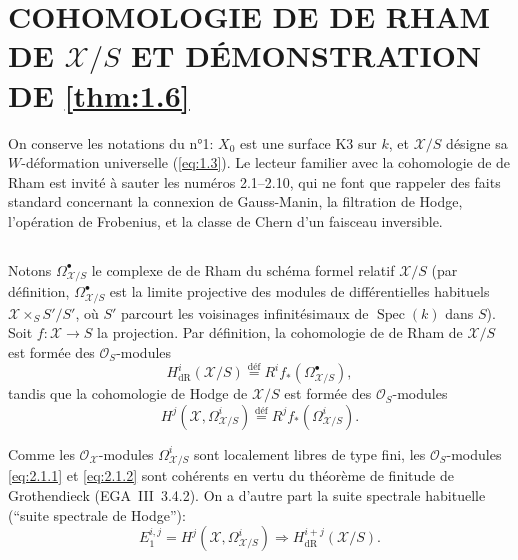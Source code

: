 \documentclass[12pt,a4paper]{article}
\theoremstyle{plain}
\theoremstyle{definition}
\theoremstyle{remark}
\DeclareMathOperator{\Spec}{Spec}
\begin{document}
\section{COHOMOLOGIE DE DE RHAM DE $\mathcal{X}/S$ ET DÉMONSTRATION DE \ref{thm:1.6}}\label{sec:2}

On conserve les notations du n°1: $X_0$ est une surface K3 sur $k$, et $\mathcal{X}/S$ désigne sa $W$-déformation universelle (\eqref{eq:1.3}). Le lecteur familier avec la cohomologie de de Rham est invité à sauter les numéros 2.1--2.10, qui ne font que rappeler des faits standard concernant la connexion de Gauss-Manin, la filtration de Hodge, l'opération de Frobenius, et la classe de Chern d'un faisceau inversible.

\subsection{}

Notons $\Omega_{\mathcal{X}/S}^{\bullet}$ le complexe de de Rham du schéma formel relatif $\mathcal{X}/S$ (par définition, $\Omega_{\mathcal{X}/S}^{\bullet}$ est la limite projective des modules de différentielles habituels $\mathcal{X} \times_S S'/S'$, où $S'$ parcourt les voisinages infinitésimaux de $\Spec(k)$ dans $S$). Soit $f: \mathcal{X} \to S$ la projection. Par définition, la cohomologie de de Rham de $\mathcal{X}/S$ est formée des $\mathcal{O}_S$-modules
\begin{equation}\label{eq:2.1.1}
H^i_{\mathrm{dR}}(\mathcal{X}/S) \overset{\text{déf}}{=} R^i f_*(\Omega_{\mathcal{X}/S}^{\bullet}),
\end{equation}
tandis que la cohomologie de Hodge de $\mathcal{X}/S$ est formée des $\mathcal{O}_S$-modules
\begin{equation}\label{eq:2.1.2}
H^j(\mathcal{X}, \Omega_{\mathcal{X}/S}^i) \overset{\text{déf}}{=} R^j f_*(\Omega_{\mathcal{X}/S}^i).
\end{equation}

Comme les $\mathcal{O}_{\mathcal{X}}$-modules $\Omega_{\mathcal{X}/S}^i$ sont localement libres de type fini, les $\mathcal{O}_S$-modules \eqref{eq:2.1.1} et \eqref{eq:2.1.2} sont cohérents en vertu du théorème de finitude de Grothendieck (EGA~III~3.4.2). On a d'autre part la suite spectrale habituelle (``suite spectrale de Hodge''):
\begin{equation}\label{eq:2.1.3}
E_1^{i,j} = H^j(\mathcal{X}, \Omega_{\mathcal{X}/S}^i) \Rightarrow H^{i+j}_{\mathrm{dR}}(\mathcal{X}/S).
\end{equation}
\end{document}
